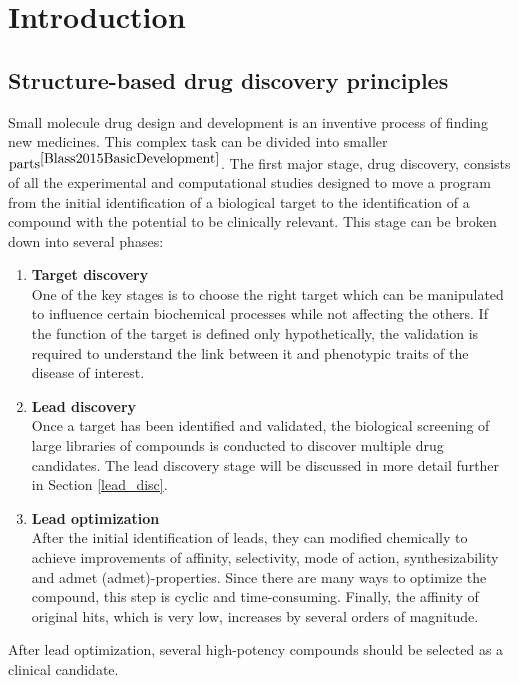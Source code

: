\chapter{Introduction}
\section{Structure-based drug discovery principles}
Small molecule drug design and development is an inventive process of finding new medicines.
This complex task can be divided into smaller $\text{parts}^{\cite{Blass2015BasicDevelopment}}$. 
The first major stage, drug discovery, consists of all the experimental and computational studies designed to move a program from the initial identification of a biological target to the identification of a compound with the potential to be clinically relevant.
This stage can be broken down into several phases:
\begin{enumerate}
    \item \textbf{Target discovery}\\
    One of the key stages is to choose the right target which can be manipulated to influence certain biochemical processes while not affecting the others.
    If the function of the target is defined only hypothetically, the validation is required to understand the link between it and phenotypic traits of the disease of interest.
    \item \textbf{Lead discovery}\\
    Once a target has been identified and validated, the biological screening of large libraries of compounds is conducted to discover multiple drug candidates.
    The lead discovery stage will be discussed in more detail further in Section \ref{lead_disc}.
    \item \textbf{Lead optimization}\\
    After the initial identification of leads, they can modified chemically to achieve improvements of  affinity, selectivity, mode of action, synthesizability and \acrshort{admet} (\acrlong{admet})-properties.
    Since there are many ways to optimize the compound, this step is cyclic and time-consuming. Finally, the affinity of \glqq original hits\grqq, which is very low, increases by several orders of magnitude.
\end{enumerate}

After lead optimization, several high-potency compounds should be selected as a clinical candidate.


